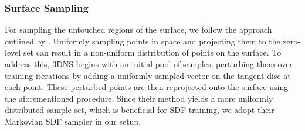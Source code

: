 
\subsubsection{Surface Sampling}

For sampling the untouched regions of the surface, we follow the approach outlined by \cite{tzathas20233d}. Uniformly sampling points in space and projecting them to the zero-level set can result in a non-uniform distribution of points on the surface. To address this, 3DNS begins with an initial pool of samples, perturbing them over training iterations by adding a uniformly sampled vector on the tangent disc at each point. These perturbed points are then reprojected onto the surface using the aforementioned procedure. Since their method yields a more uniformly distributed sample set, which is beneficial for SDF training, we adopt their Markovian SDF sampler in our setup.


